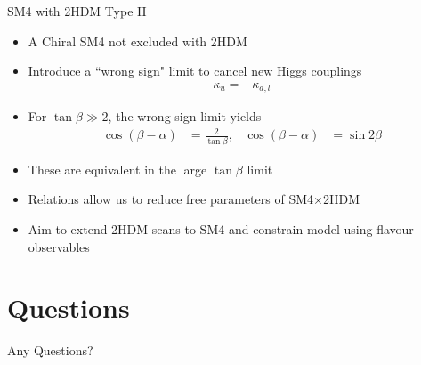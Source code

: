 \documentclass[10pt,xcolor={table,dvipsnames},t]{beamer}
\begin{document}
\begin{frame}{SM4 with 2HDM Type II}
    \begin{itemize}
        \item A Chiral SM4 not excluded with 2HDM 
        \item Introduce a ``wrong sign" limit to cancel new Higgs couplings
            \begin{align*}
                \kappa_u = -\kappa_{d,l}
            \end{align*}
        \item For $\tan\beta\gg2$, the wrong sign limit yields
            \begin{align*}
                \cos(\beta-\alpha) &= \frac{2}{\tan\beta}, & \cos(\beta-\alpha) &= \sin2\beta
            \end{align*}
        \item These are equivalent in the large $\tan\beta$ limit
        \item Relations allow us to reduce free parameters of SM4$\times$2HDM
        \item Aim to extend 2HDM scans to SM4 and constrain model using flavour observables
    \end{itemize}
\end{frame}

\section{Questions}
\begin{frame}
    \begin{center}
        \vspace{60pt}
        \Huge Any Questions?
    \end{center}
\end{frame}
\end{document}
